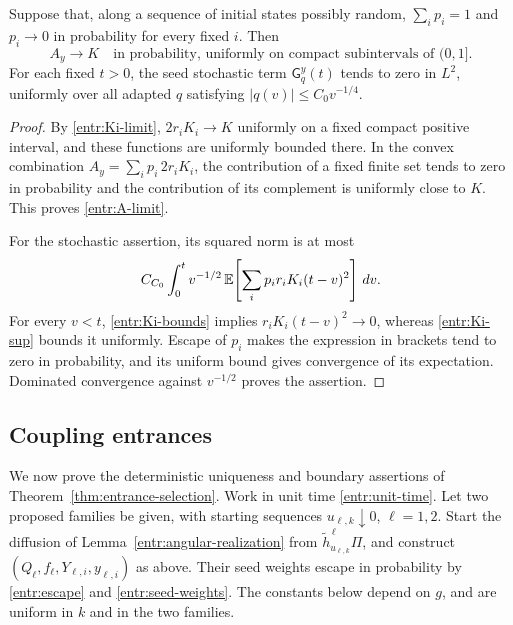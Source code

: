 \begin{lemma}\label{entr:escaping-seeds}
Suppose that, along a sequence of initial states possibly random,
\(\sum_i p_i=1\) and \(p_i\to0\) in probability for every fixed \(i\).
Then
\begin{equation}\label{entr:A-limit}
 A_y\longrightarrow K
 \quad\text{in probability, uniformly on compact subintervals of \((0,1]\)}.
\end{equation}
For each fixed \(t>0\), the seed stochastic term
\(\mathsf G_q^y(t)\) tends to zero in \(L^2\), uniformly over all
adapted \(q\) satisfying \(|q(v)|\le C_0v^{-1/4}\).
\end{lemma}

\begin{proof}
By \eqref{entr:Ki-limit},
\(2r_iK_i\to K\) uniformly on a fixed compact positive interval,
and these functions are uniformly bounded there.  In the convex
combination \(A_y=\sum_i p_i\,2r_iK_i\), the contribution of a
fixed finite set tends to zero in probability and the contribution
of its complement is uniformly close to \(K\).  This proves
\eqref{entr:A-limit}.

For the stochastic assertion, its squared norm is at most
\[
 C_{C_0}\int_0^t v^{-1/2}\,
       \mathbb E\!\left[\sum_i p_i r_i K_i(t-v)^2\right]\,dv .
\]
For every \(v<t\), \eqref{entr:Ki-bounds} implies
\(r_iK_i(t-v)^2\to0\), whereas \eqref{entr:Ki-sup} bounds it
uniformly.  Escape of \(p_i\) makes the expression in brackets tend
to zero in probability, and its uniform bound gives convergence of
its expectation.  Dominated convergence against \(v^{-1/2}\)
proves the assertion.
\end{proof}

\subsection{Coupling entrances}

We now prove the deterministic uniqueness and boundary assertions of
Theorem~\ref{thm:entrance-selection}.  Work in unit time
\eqref{entr:unit-time}.  Let two proposed families be given, with
starting sequences \(u_{\ell,k}\downarrow0\), \(\ell=1,2\).
Start the diffusion of Lemma~\ref{entr:angular-realization} from
\(\widetilde h^{\,\ell}_{u_{\ell,k}}\Pi\), and construct
\((Q_\ell,f_\ell,Y_{\ell,i},y_{\ell,i})\) as above.  Their seed weights
escape in probability by \eqref{entr:escape} and
\eqref{entr:seed-weights}.  The constants below depend on \(g\), and
are uniform in \(k\) and in the two families.

